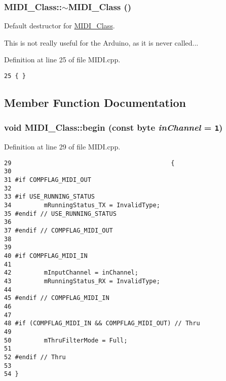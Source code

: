\hypertarget{class_m_i_d_i___class_cea4c4db7092ba5cb7c147a3fb215e07}{
\subsubsection[{$\sim$MIDI\_\-Class}]{\setlength{\rightskip}{0pt plus 5cm}MIDI\_\-Class::$\sim$MIDI\_\-Class ()}}
\label{class_m_i_d_i___class_cea4c4db7092ba5cb7c147a3fb215e07}


Default destructor for \hyperlink{class_m_i_d_i___class}{MIDI\_\-Class}.\par
 This is not really useful for the Arduino, as it is never called... 

Definition at line 25 of file MIDI.cpp.

\begin{Code}\begin{verbatim}25 { }
\end{verbatim}
\end{Code}




\subsection{Member Function Documentation}
\hypertarget{class_m_i_d_i___class_c34d163205bb01ac5e03df7e64facebe}{
\subsubsection[{begin}]{\setlength{\rightskip}{0pt plus 5cm}void MIDI\_\-Class::begin (const byte {\em inChannel} = {\tt 1})}}
\label{class_m_i_d_i___class_c34d163205bb01ac5e03df7e64facebe}




Definition at line 29 of file MIDI.cpp.

\begin{Code}\begin{verbatim}29                                            {
30         
31 #if COMPFLAG_MIDI_OUT
32         
33 #if USE_RUNNING_STATUS
34         mRunningStatus_TX = InvalidType;
35 #endif // USE_RUNNING_STATUS
36         
37 #endif // COMPFLAG_MIDI_OUT
38         
39         
40 #if COMPFLAG_MIDI_IN
41         
42         mInputChannel = inChannel;
43         mRunningStatus_RX = InvalidType;
44         
45 #endif // COMPFLAG_MIDI_IN
46         
47         
48 #if (COMPFLAG_MIDI_IN && COMPFLAG_MIDI_OUT) // Thru
49         
50         mThruFilterMode = Full;
51         
52 #endif // Thru
53         
54 }
\end{verbatim}
\end{Code}


